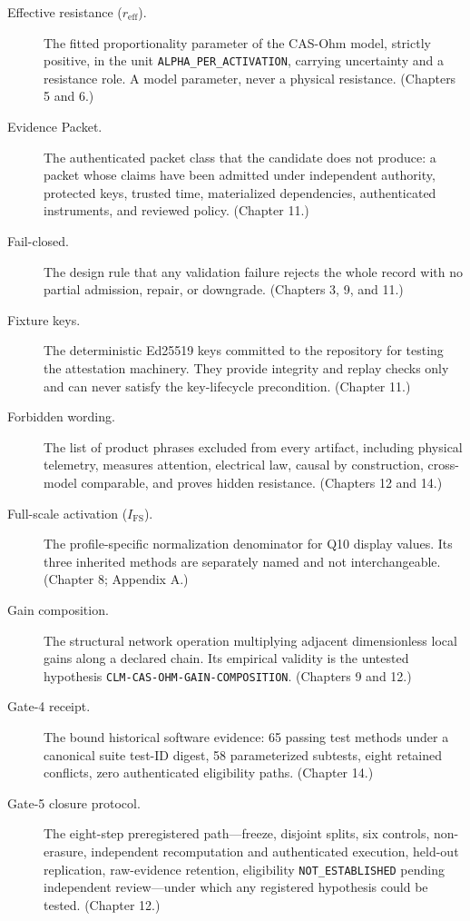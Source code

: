 \begin{description}
\item[Effective resistance ($r_{\mathrm{eff}}$).] The fitted proportionality parameter of the CAS-Ohm model, strictly positive, in the unit \texttt{ALPHA\_PER\_ACTIVATION}, carrying uncertainty and a resistance role. A model parameter, never a physical resistance. (Chapters 5 and 6.)

\item[Evidence Packet.] The authenticated packet class that the candidate does not produce: a packet whose claims have been admitted under independent authority, protected keys, trusted time, materialized dependencies, authenticated instruments, and reviewed policy. (Chapter 11.)

\item[Fail-closed.] The design rule that any validation failure rejects the whole record with no partial admission, repair, or downgrade. (Chapters 3, 9, and 11.)

\item[Fixture keys.] The deterministic Ed25519 keys committed to the repository for testing the attestation machinery. They provide integrity and replay checks only and can never satisfy the key-lifecycle precondition. (Chapter 11.)

\item[Forbidden wording.] The list of product phrases excluded from every artifact, including physical telemetry, measures attention, electrical law, causal by construction, cross-model comparable, and proves hidden resistance. (Chapters 12 and 14.)

\item[Full-scale activation ($I_{\mathrm{FS}}$).] The profile-specific normalization denominator for Q10 display values. Its three inherited methods are separately named and not interchangeable. (Chapter 8; Appendix A.)

\item[Gain composition.] The structural network operation multiplying adjacent dimensionless local gains along a declared chain. Its empirical validity is the untested hypothesis \texttt{CLM-CAS-OHM-GAIN-COMPOSITION}. (Chapters 9 and 12.)

\item[Gate-4 receipt.] The bound historical software evidence: 65 passing test methods under a canonical suite test-ID digest, 58 parameterized subtests, eight retained conflicts, zero authenticated eligibility paths. (Chapter 14.)

\item[Gate-5 closure protocol.] The eight-step preregistered path---freeze, disjoint splits, six controls, non-erasure, independent recomputation and authenticated execution, held-out replication, raw-evidence retention, eligibility \texttt{NOT\_ESTABLISHED} pending independent review---under which any registered hypothesis could be tested. (Chapter 12.)


\end{description}
